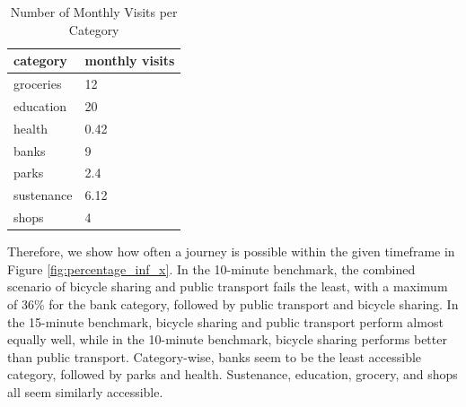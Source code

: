 \begin{table}
  \caption{Number of Monthly Visits per Category}
  \label{tab:monthly_visits}
  \begin{center}
    \begin{tabular}[c]{l|l}
      category & monthly visits \\
      \hline
      groceries & 12 \\
      education & 20 \\
      health & 0.42 \\
      banks & 9 \\
      parks & 2.4 \\
      sustenance & 6.12 \\
      shops & 4 \\
      \hline
    \end{tabular}
  \end{center}
\end{table}

Therefore, we show how often a journey is possible within the given timeframe in Figure \ref{fig:percentage_inf_x}.
In the 10-minute benchmark, the combined scenario of bicycle sharing and public transport fails the least, with a maximum of 36\% for the bank category, followed by public transport and bicycle sharing.
In the 15-minute benchmark, bicycle sharing and public transport perform almost equally well, while in the 10-minute benchmark, bicycle sharing performs better than public transport.
Category-wise, banks seem to be the least accessible category, followed by parks and health.
Sustenance, education, grocery, and shops all seem similarly accessible.

